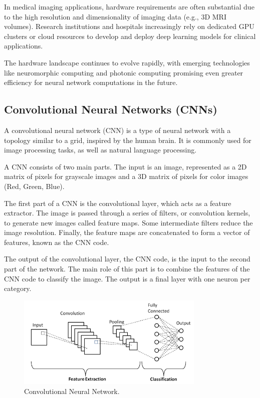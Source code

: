 In medical imaging applications, hardware requirements are often substantial due to the high resolution and dimensionality of imaging data (e.g., 3D MRI volumes). Research institutions and hospitals increasingly rely on dedicated GPU clusters or cloud resources to develop and deploy deep learning models for clinical applications.

The hardware landscape continues to evolve rapidly, with emerging technologies like neuromorphic computing and photonic computing promising even greater efficiency for neural network computations in the future.

\subsection{Convolutional Neural Networks (CNNs)}
\label{sec:cnn}
A convolutional neural network (CNN) is a type of neural network with a topology similar to a grid, inspired by the human brain. It is commonly used for image processing tasks, as well as natural language processing.

A CNN consists of two main parts. The input is an image, represented as a 2D matrix of pixels for grayscale images and a 3D matrix of pixels for color images (Red, Green, Blue).

The first part of a CNN is the convolutional layer, which acts as a feature extractor. The image is passed through a series of filters, or convolution kernels, to generate new images called feature maps. Some intermediate filters reduce the image resolution. Finally, the feature maps are concatenated to form a vector of features, known as the CNN code.

The output of the convolutional layer, the CNN code, is the input to the second part of the network. The main role of this part is to combine the features of the CNN code to classify the image. The output is a final layer with one neuron per category.
\begin{figure}[H]
  \centering
  \includegraphics[width=0.8\textwidth]{Images/Chapter1/cnn.png}
  \caption{Convolutional Neural Network.}
  \label{fig:cnn}
\end{figure}

